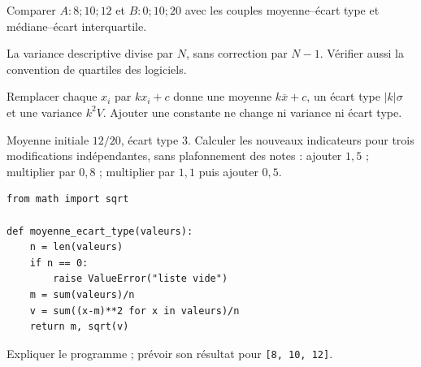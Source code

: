 \begin{example}Comparer $A:8;10;12$ et $B:0;10;20$ avec les couples moyenne--écart type et médiane--écart interquartile.\end{example}
\begin{teachernote}La variance descriptive divise par $N$, sans correction par $N-1$. Vérifier aussi la convention de quartiles des logiciels.\end{teachernote}
\begin{keypoint}[Propriété]
Remplacer chaque $x_i$ par $kx_i+c$ donne une moyenne $k\overline x+c$, un écart type $|k|\sigma$ et une variance $k^2V$. Ajouter une constante ne change ni variance ni écart type.
\end{keypoint}
\begin{example}Moyenne initiale $12/20$, écart type $3$. Calculer les nouveaux indicateurs pour trois modifications indépendantes, sans plafonnement des notes : ajouter $1{,}5$ ; multiplier par $0{,}8$ ; multiplier par $1{,}1$ puis ajouter $0{,}5$.\end{example}
\begin{lstlisting}
from math import sqrt

def moyenne_ecart_type(valeurs):
    n = len(valeurs)
    if n == 0:
        raise ValueError("liste vide")
    m = sum(valeurs)/n
    v = sum((x-m)**2 for x in valeurs)/n
    return m, sqrt(v)
\end{lstlisting}
\begin{example}Expliquer le programme ; prévoir son résultat pour \texttt{[8, 10, 12]}.\end{example}
